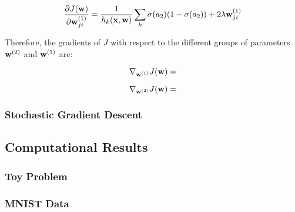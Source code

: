 \begin{equation}
\frac{\partial J(\boldsymbol{\mathbf{w}})}{\partial \boldsymbol{\mathbf{w}}^{(1)}_{ji}} = \frac{1}{h_k(\boldsymbol{\mathbf{x}},\boldsymbol{\mathbf{w}})}\sum_k \sigma(a_2) (1 - \sigma(a_2)) + 2 \lambda \boldsymbol{\mathbf{w}}^{(1)}_{ji}
\end{equation}

Therefore, the gradients of $J$ with respect to the different groups of parameters $\boldsymbol{\mathbf{w}}^{(2)}$ and $\boldsymbol{\mathbf{w}}^{(1)}$ are:

\begin{equation}
\nabla_{\boldsymbol{\mathbf{w}}^{(1)}} J(\boldsymbol{\mathbf{w}}) = 
\end{equation}

\begin{equation}
\nabla_{\boldsymbol{\mathbf{w}}^{(2)}} J(\boldsymbol{\mathbf{w}}) = 
\end{equation}

\subsubsection{Stochastic Gradient Descent}



\subsection{Computational Results}

\subsubsection{Toy Problem}

\subsubsection{MNIST Data}



